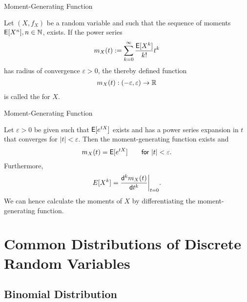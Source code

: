 \begin{frame}{Moment-Generating Function}

\justifying
{} Let $(X, f_X)$ be a random variable and such that the sequence of moments $\mathsf{E}[X^n], n\in \mathbb{N}$, exists. If the power series 
\begin{align*}
m_X(t) := \sum_{k=0}^{\infty} \frac{\mathsf{E}[X^k]}{k!} t^k
\end{align*}
has radius of convergence $\varepsilon > 0$, the thereby defined function
\begin{align*}
m_X(t): (-\varepsilon, \varepsilon) \rightarrow \mathbb{R}
\end{align*}
is called the  for $X$.

\end{frame}


\begin{frame}{Moment-Generating Function}

\justifying
{} Let $\varepsilon > 0$ be given such that $\mathsf{E}[e^{tX}]$ exists and has a power series expansion in $t$ that converges for $|t| < \varepsilon$. Then the moment-generating function exists and 
\begin{align*}
m_X(t) = \mathsf{E}[e^{tX}] \qquad \mathsf{for\ } |t| < \varepsilon.
\end{align*}
Furthermore, 
\begin{align*}
E[X^k] = \frac{\mathsf{d}^k m_X(t)}{\mathsf{d}t^k}\bigg|_{t=0}.
\end{align*}
We can hence calculate the moments of $X$ by differentiating the moment-generating function.

\end{frame}

\section{Common Distributions of Discrete Random Variables}

\subsection{Binomial Distribution}

